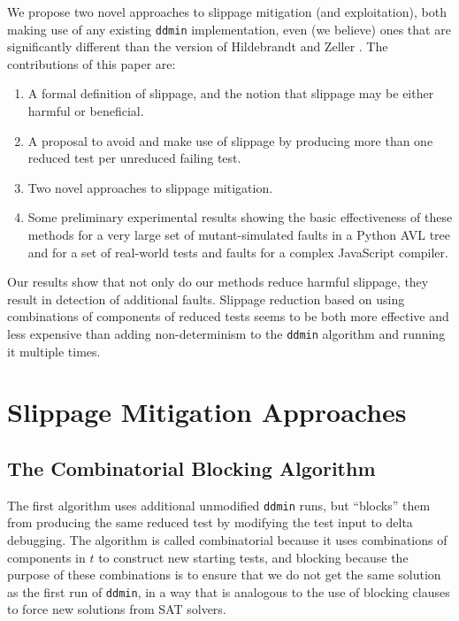 We
propose two novel approaches to slippage mitigation (and
exploitation), both making use of any existing {\tt ddmin}
implementation, even (we believe) ones that are significantly different than the
version of Hildebrandt and Zeller \cite{DD}.  The contributions of this paper are:

\begin{enumerate}
\item A formal definition of slippage, and the notion that slippage
  may be either harmful or beneficial.
\item A proposal to avoid and make use of slippage by producing more
  than one reduced test per unreduced failing test.
\item Two novel approaches to slippage mitigation.
\item Some preliminary experimental results showing the basic effectiveness of these
  methods for a very large set of mutant-simulated faults in a Python
  AVL tree and for a set of real-world tests and faults for a complex
  JavaScript compiler.
\end{enumerate}

Our results show that not only do our methods reduce harmful slippage,
they result in detection of additional faults.  Slippage reduction
based on using combinations of components of reduced tests seems to be
both more effective and less expensive than adding non-determinism to
the {\tt ddmin} algorithm and running it multiple times.

\section{Slippage Mitigation Approaches}

\subsection{The Combinatorial Blocking Algorithm}

The first algorithm uses additional unmodified {\tt ddmin} runs, but
``blocks'' them from producing the same reduced test by modifying the
test input to delta debugging.  The algorithm is called combinatorial
because it uses combinations of components in $t$ to construct new
starting tests, and blocking because the purpose of these combinations
is to ensure that we do not get the same solution as the first run of
{\tt ddmin}, in a way that is analogous to the use of blocking clauses
to force new solutions from SAT solvers.

